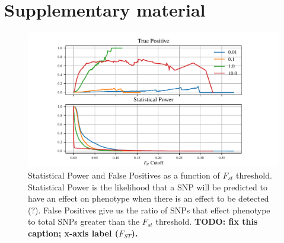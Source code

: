 \documentclass{article}
\begin{document}

{}

\clearpage
\appendix
\setcounter{table}{0}
\renewcommand{\thetable}{S\arabic{table}}
\setcounter{figure}{0}
\renewcommand{\thefigure}{S\arabic{figure}}

\section*{Supplementary material}

\begin{figure}
    \begin{center}
          \includegraphics{Final_Plots/True_Power_0_25_500.pdf}
          \caption{ 
        Statistical Power and False Positives as a function of $F_{st}$ threshold. 
        Statistical Power is the likelihood that a SNP will be predicted to have an effect on phenotype when there is an effect to be detected (?).
        False Positives give us the ratio of SNPs that effect phenotype to total SNPs greater than the $F_{st}$ threshold.
            \textbf{
                TODO: fix this caption; x-axis label ($F_{ST}$).}
        }
          \label{fig:Power_FP}
    \end{center}
\end{figure}
\end{document}
